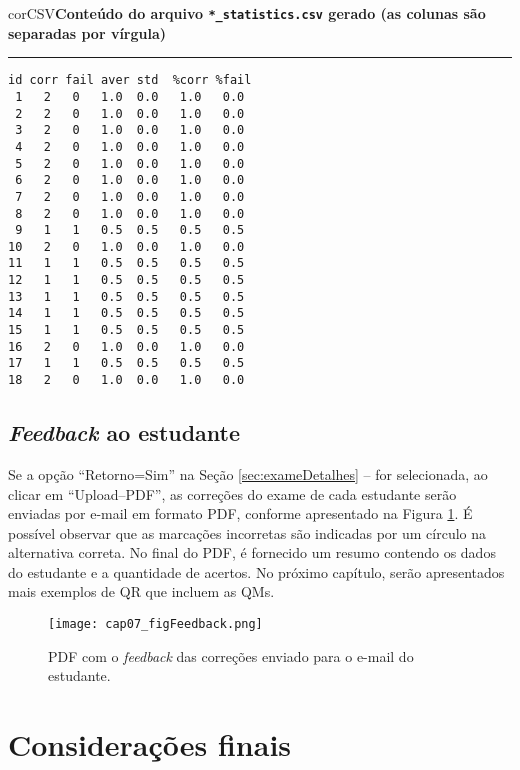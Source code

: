 \begin{myboxCode}{corCSV}{\textbf{Conteúdo do arquivo \texttt{*\_statistics.csv} gerado (as colunas são separadas por vírgula)}}\vspace{3mm}
\hrule
{\footnotesize
\begin{verbatim}
id corr fail aver std  %corr %fail
 1   2   0   1.0  0.0   1.0   0.0
 2   2   0   1.0  0.0   1.0   0.0
 3   2   0   1.0  0.0   1.0   0.0
 4   2   0   1.0  0.0   1.0   0.0
 5   2   0   1.0  0.0   1.0   0.0
 6   2   0   1.0  0.0   1.0   0.0
 7   2   0   1.0  0.0   1.0   0.0
 8   2   0   1.0  0.0   1.0   0.0
 9   1   1   0.5  0.5   0.5   0.5
10   2   0   1.0  0.0   1.0   0.0
11   1   1   0.5  0.5   0.5   0.5
12   1   1   0.5  0.5   0.5   0.5
13   1   1   0.5  0.5   0.5   0.5
14   1   1   0.5  0.5   0.5   0.5
15   1   1   0.5  0.5   0.5   0.5
16   2   0   1.0  0.0   1.0   0.0
17   1   1   0.5  0.5   0.5   0.5
18   2   0   1.0  0.0   1.0   0.0
\end{verbatim}
}
\end{myboxCode}

\subsection{\textit{Feedback} ao estudante}


Se a opção ``Retorno=Sim'' na Seção \ref{sec:exameDetalhes} --  for selecionada, ao clicar em ``Upload--PDF'', as correções do exame de cada estudante serão enviadas por e-mail em formato PDF, conforme apresentado na Figura \ref{fig:cap07_figFeedback}. É possível observar que as marcações incorretas são indicadas por um círculo na alternativa correta. No final do PDF, é fornecido um resumo contendo os dados do estudante e a quantidade de acertos. No próximo capítulo, serão apresentados mais exemplos de QR que incluem as QMs.

\begin{figure}[htbp]
  \centering
  \texttt{[image: cap07\_figFeedback.png]}
    \caption{PDF com o \textit{feedback} das correções enviado para o e-mail do estudante.}
\label{fig:cap07_figFeedback}
\end{figure}


\section{Considerações finais}

